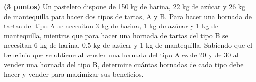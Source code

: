 
\textbf{(3 puntos)} Un pastelero dispone de 150 kg de harina, 22 kg de azúcar y 26 kg de mantequilla para hacer dos tipos de tartas, A y B. Para hacer una hornada de tartas del tipo A se necesitan 3 kg de harina, 1 kg de azúcar y 1 kg de mantequilla, mientras que para hacer una hornada de tartas del tipo B se necesitan 6 kg de harina, $0.5$ kg de azúcar y 1 kg de mantequilla. Sabiendo que el beneficio que se obtiene al vender una hornada del tipo A es de 20 \texteuro{} y de 30 \texteuro{} al vender una hornada del tipo B, determine cuántas hornadas de cada tipo debe hacer y vender para maximizar sus beneficios.
